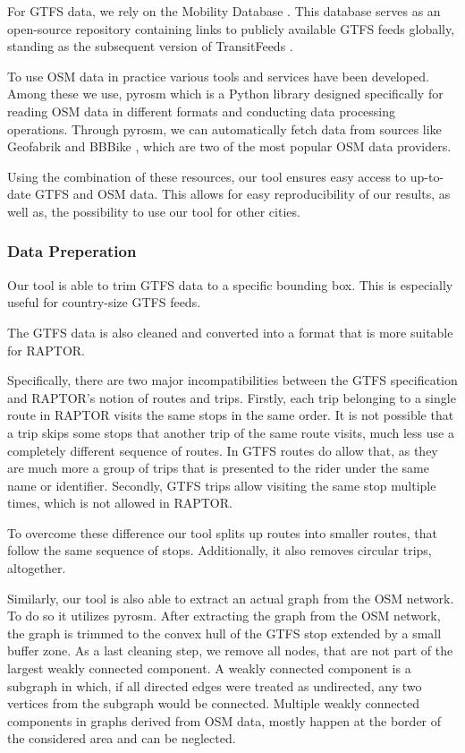 For GTFS data, we rely on the Mobility Database .
This database serves as an open-source repository containing links to publicly available GTFS feeds globally, standing as the subsequent version of TransitFeeds .

To use OSM data in practice various tools and services have been developed.
Among these we use, pyrosm  which is a Python library designed specifically for reading OSM data in different formats and conducting data processing operations.
Through pyrosm, we can automatically fetch data from sources like Geofabrik \cite{GeofabrikDownloadServer} and BBBike \cite{BBBikeExtractsOpenStreetMap}, which are two of the most popular OSM data providers.

Using the combination of these resources, our tool ensures easy access to up-to-date GTFS and OSM data.
This allows for easy reproducibility of our results, as well as, the possibility to use our tool for other cities.

\subsubsection{Data Preperation}
\label{subs:data_preperation}

Our tool is able to trim GTFS data to a specific bounding box.
This is especially useful for country-size GTFS feeds.

The GTFS data is also cleaned and converted into a format that is more suitable for RAPTOR.

Specifically, there are two major incompatibilities between the GTFS specification and RAPTOR's notion of routes and trips.
Firstly, each trip belonging to a single route in RAPTOR visits the same stops in the same order.
It is not possible that a trip skips some stops that another trip of the same route visits, much less use a completely different sequence of routes.
In GTFS routes do allow that, as they are much more a group of trips that is presented to the rider under the same name or identifier.
Secondly, GTFS trips allow visiting the same stop multiple times, which is not allowed in RAPTOR.

To overcome these difference our tool splits up routes into smaller routes, that follow the same sequence of stops.
Additionally, it also removes circular trips, altogether.

Similarly, our tool is also able to extract an actual graph from the OSM network.
To do so it utilizes pyrosm.
After extracting the graph from the OSM network, the graph is trimmed to the convex hull of the GTFS stop extended by a small buffer zone.
As a last cleaning step, we remove all nodes, that are not part of the largest weakly connected component.
A weakly connected component is a subgraph in which, if all directed edges were treated as undirected, any two vertices from the subgraph would be connected.
Multiple weakly connected components in graphs derived from OSM data, mostly happen at the border of the considered area and can be neglected.

